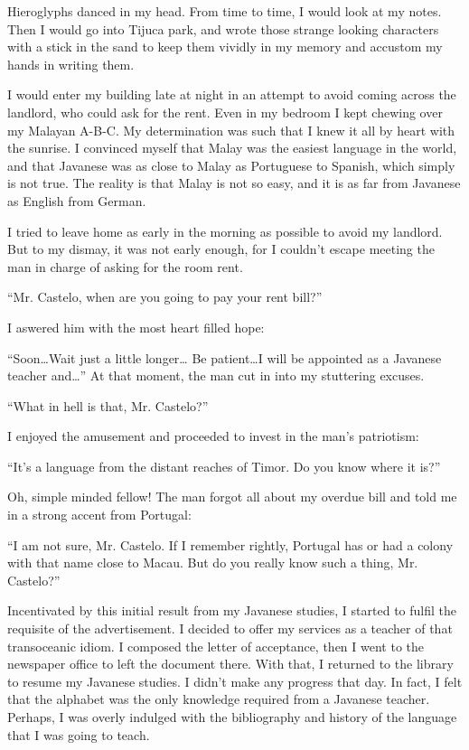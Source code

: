 \documentclass[a4paper,12pt]{book}
\begin{document}
Hieroglyphs danced in my head. From time to time,
I would look at my notes. Then I would
go into Tijuca park, and wrote
those strange looking characters
with a stick in the sand to keep
them vividly in my memory
and accustom my hands in writing them.

I would enter my building late at night in
an attempt to avoid coming across the
landlord, who could ask for the rent.
Even in my bedroom I kept chewing over
my Malayan A-B-C. My determination was such
that I knew it all by heart with the sunrise.
I convinced myself that Malay was the
easiest language in the world, and that Javanese
was as close to Malay as Portuguese to
Spanish, which simply is not true.
The reality is that Malay is not so
easy, and it is  as
far from Javanese as English from German.

I tried to leave home as early in the morning
as possible to avoid my landlord.
But to my dismay, it was not early enough,
for I couldn't escape meeting the man
in charge of asking for the room rent.

``Mr. Castelo, when are you going to
pay your rent bill?''

I aswered him with the most heart filled hope:

``Soon\ldots Wait just a little longer\ldots
Be patient\ldots I will be appointed as a
Javanese teacher and\ldots''
At that moment, the man cut in into my stuttering
excuses.

``What in hell is that, Mr. Castelo?''

I enjoyed the amusement
and proceeded to invest
in the man's patriotism:

``It's a language from the distant reaches of Timor.
Do you know where it is?''

Oh, simple minded fellow! The man forgot all about
my overdue bill and told me in a strong accent
from Portugal:

``I am not sure, Mr. Castelo. If I remember rightly,
Portugal has or had a colony with that name
close to Macau. But do you
really know such a thing, Mr. Castelo?''

Incentivated by this initial result from
my Javanese studies,
I started to fulfil the requisite of the advertisement.
I decided to offer my services as a teacher of
that transoceanic idiom. I composed the letter of
acceptance, then I went to the newspaper
office to left the document there.
With that, I returned
to the library to resume my Javanese studies.
I didn't make any progress that day. In fact, I
felt that the alphabet was the only knowledge
required from a Javanese teacher. Perhaps,
I was overly indulged with the
bibliography and history of the
language that I was going to teach.
\end{document}
